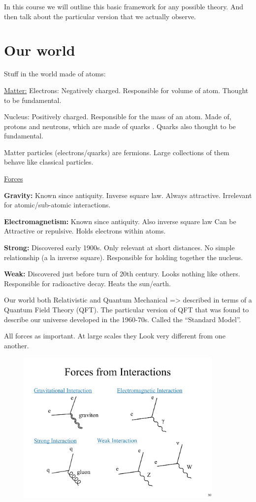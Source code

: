 {In this course we will outline this basic framework for any possible theory.
And then talk about the particular version that we actually observe.


\section{Our world}

Stuff in the world made of atoms:

\underline{Matter:}
Electrons: Negatively charged. 
Responsible for volume of atom.
Thought to be fundamental.

Nucleus: Positively charged.
Responsible for the mass of an atom.
Made of, protons and neutrons, which are made of quarks .
Quarks also thought to be fundamental.

Matter particles (electrons/quarks) are fermions.
Large collections of them behave like classical particles.

\underline{Forces}

\textbf{Gravity:}
Known since antiquity. 
Inverse square law.
Always attractive. 
Irrelevant for atomic/sub-atomic interactions.

\textbf{Electromagnetism:}
Known since antiquity.
Also inverse square law
Can be Attractive or repulsive.
Holds electrons within atoms.

\textbf{Strong:}
Discovered early 1900s.
Only relevant at short distances.
No simple relationship (a la inverse square).
Responsible for holding together the nucleus.

\textbf{Weak:}
Discovered just before turn of 20th century.
Looks nothing like others.
Responsible for radioactive decay. 
Heats the sun/earth.

Our world both Relativistic and Quantum Mechanical => described in terms of a Quantum Field Theory (QFT).
The particular version of QFT that was found to describe our universe developed in the 1960-70s.
Called the ``Standard Model''.

All forces as important.
At large scales they Look very different from one another.

\begin{figure}[h]
\centering
\includegraphics[width=0.9\textwidth]{./Forces.pdf}
\end{figure}

}

